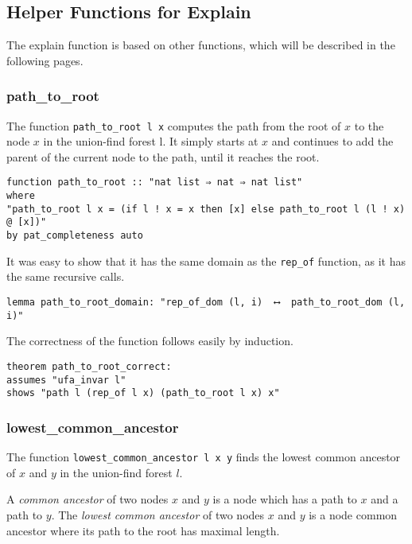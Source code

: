 \subsection{Helper Functions for Explain}

The explain function is based on other functions, which will be described in the following pages. 

\subsubsection{path\_to\_root}

The function \lstinline{path_to_root l x} computes the path from the root of $x$ to the node $x$ in the union-find forest l. It simply starts at $x$ and continues to add the parent of the current node to the path, until it reaches the root.

\begin{lstlisting}
function path_to_root :: "nat list ⇒ nat ⇒ nat list"
where 
"path_to_root l x = (if l ! x = x then [x] else path_to_root l (l ! x) @ [x])"
by pat_completeness auto
\end{lstlisting}

It was easy to show that it has the same domain as the \lstinline{rep_of} function, as it has the same recursive calls.

\begin{lstlisting}
lemma path_to_root_domain: "rep_of_dom (l, i)  ⟷  path_to_root_dom (l, i)" 
\end{lstlisting}

The correctness of the function follows easily by induction.

\begin{lstlisting}
theorem path_to_root_correct:
assumes "ufa_invar l"
shows "path l (rep_of l x) (path_to_root l x) x"
\end{lstlisting}

\subsubsection{lowest\_common\_ancestor}

The function \lstinline{lowest_common_ancestor l x y} finds the lowest common ancestor of $x$ and $y$ in the union-find forest $l$. 

\begin{definition}
	A \emph{common ancestor} of two nodes $x$ and $y$ is a node which has a path to $x$ and a path to $y$.
	The \emph{lowest common ancestor} of two nodes $x$ and $y$ is a node common ancestor where its path to the root has maximal length.
\end{definition}

